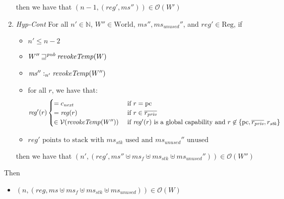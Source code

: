 \documentclass[format=acmsmall, review=true, screen=true]{acmart}
\newcommand{\var}[1]{\mathit{#1}}
\newcommand{\hs}{\var{ms}}
\newcommand{\ms}{\hs}
\newcommand{\pcreg}{\mathrm{pc}}
\newcommand{\reg}{\var{reg}}
\newcommand{\heap}{\var{mem}}
\newcommand{\stk}{\var{stk}}
\newcommand{\plainfun}[2]{
  \ifthenelse{\equal{#2}{}}
  {\mathit{#1}}
  {\mathit{#1}(#2)}
}
\newcommand{\revokeTemp}[1]{\plainfun{revokeTemp}{#1}}
\newcommand{\futurewk}{\mathbin{\sqsupseteq}^{\var{pub}}}
\newcommand{\heapSat}[3][\heap]{#1 :_{#2} #3}
\newcommand{\memSat}[3][n]{\heapSat[#2]{#1}{#3}}
\newcommand{\asmType}{\plaindom{AsmType}}
\newcommand{\plaindom}[1]{\mathrm{#1}}
\newcommand{\Regs}{\plaindom{Reg}}
\newcommand{\nats}{\mathbb{N}}
\newcommand{\Worlds}{\plaindom{World}}
\newcommand{\intr}[2]{\mathcal{#1}}
\newcommand{\valueintr}[1]{\intr{V}{#1}}
\newcommand{\stdvr}{\valueintr{\asmType}}
\newcommand{\observations}{\mathcal{O}}
\newcommand{\npair}[2][n]{\left(#1,#2 \right)}
\newenvironment{toplas}%
    {\color{OliveGreen}}{}
\begin{document}
\begin{toplas}
\begin{lemma}
\begin{enumerate}
    then we have that $\npair[n-1]{(\reg',\ms'')} \in \observations(W')$
  \item \label{item:scall:hyp-cont} \emph{Hyp-Cont} For all $n' \in \nats$, $W''
    \in \Worlds$, $\ms'', \ms_\var{unused}''$, and $\reg' \in \Regs$, if
    \begin{itemize}
    \item $n' \leq n-2$
    \item $W'' \futurewk \revokeTemp{W}$
    \item $\memSat[n']{\ms''}{\revokeTemp{W''}}$ 
    \item for all $r$, we have that:
      \begin{equation*}
        \reg'(r)
        \begin{cases}
          = c_{\mathit{next}} &\text{ if } r = \pcreg\\
          = \reg(r)&\text{ if } r \in \overline{r_{\mathit{priv}}}\\
          \in \stdvr(\revokeTemp{W''}) &\text{ if $\reg'(r)$ is a global capability and } r \not\in \{\pcreg,\overline{r_{\mathit{priv}}}, r_\stk\}
        \end{cases}
      \end{equation*}
    \item $\reg' \text{ points to stack with $\ms_\stk$ used and $\ms_{\mathit{unused}}''$ unused}$
    \end{itemize}

    then we have that $\npair[n']{(\reg',\ms'' \uplus \ms_f \uplus \ms_\stk \uplus \ms_{\var{unused}}'')} \in \observations(W'')$
  \end{enumerate}
  Then 
  \begin{itemize}
    \item $\npair{(\reg,\ms \uplus \ms_f \uplus \ms_\stk \uplus \ms_{\var{unused}})} \in \observations(W)$
  \end{itemize}

\end{lemma}
\begin{figure}[htb]
  \centering
  \begin{subfigure}{0.43\linewidth}
\end{subfigure}
\end{figure}
\end{toplas}
\end{document}
